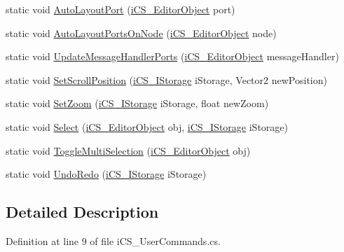 \begin{DoxyCompactItemize}
static void \hyperlink{classi_c_s___user_commands_a6d02160b42202a3eabe25cae83c0cf98}{Auto\+Layout\+Port} (\hyperlink{classi_c_s___editor_object}{i\+C\+S\+\_\+\+Editor\+Object} port)
\item 
static void \hyperlink{classi_c_s___user_commands_af8857729aa06630238a07d3ff5eee6d0}{Auto\+Layout\+Ports\+On\+Node} (\hyperlink{classi_c_s___editor_object}{i\+C\+S\+\_\+\+Editor\+Object} node)
\item 
static void \hyperlink{classi_c_s___user_commands_ae15e0e5e186659e93c771fc086007abd}{Update\+Message\+Handler\+Ports} (\hyperlink{classi_c_s___editor_object}{i\+C\+S\+\_\+\+Editor\+Object} message\+Handler)
\item 
static void \hyperlink{classi_c_s___user_commands_a95c56029f1290a72da7898d4b61fb298}{Set\+Scroll\+Position} (\hyperlink{classi_c_s___i_storage}{i\+C\+S\+\_\+\+I\+Storage} i\+Storage, Vector2 new\+Position)
\item 
static void \hyperlink{classi_c_s___user_commands_aa69f6549c7a8891c618994d8c51d1f51}{Set\+Zoom} (\hyperlink{classi_c_s___i_storage}{i\+C\+S\+\_\+\+I\+Storage} i\+Storage, float new\+Zoom)
\item 
static void \hyperlink{classi_c_s___user_commands_a24bbb5b01336d3a6e3bd3eaac7da2f87}{Select} (\hyperlink{classi_c_s___editor_object}{i\+C\+S\+\_\+\+Editor\+Object} obj, \hyperlink{classi_c_s___i_storage}{i\+C\+S\+\_\+\+I\+Storage} i\+Storage)
\item 
static void \hyperlink{classi_c_s___user_commands_a53f74870ff154a6b7399fc64506f9cb0}{Toggle\+Multi\+Selection} (\hyperlink{classi_c_s___editor_object}{i\+C\+S\+\_\+\+Editor\+Object} obj)
\item 
static void \hyperlink{classi_c_s___user_commands_a2b8f752d9bdb96241bf444e6f0aad607}{Undo\+Redo} (\hyperlink{classi_c_s___i_storage}{i\+C\+S\+\_\+\+I\+Storage} i\+Storage)
\end{DoxyCompactItemize}


\subsection{Detailed Description}


Definition at line 9 of file i\+C\+S\+\_\+\+User\+Commands.\+cs.




